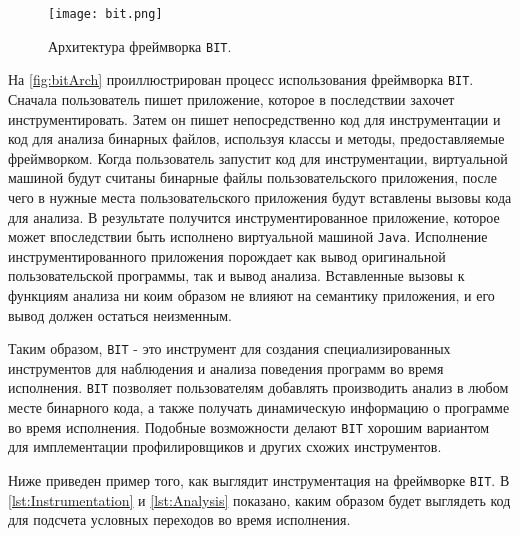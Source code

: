 \begin{figure}[h]
\centering
\texttt{[image: bit.png]}
\caption{Архитектура фреймворка \texttt{BIT}.}
\label{fig:bitArch}
\end{figure}

На \autoref{fig:bitArch} проиллюстрирован процесс использования фреймворка \texttt{BIT}. Сначала пользователь пишет приложение, которое в последствии захочет инструментировать. Затем он пишет непосредственно код для инструментации и код для анализа бинарных файлов, используя классы и методы, предоставляемые фреймворком. Когда пользователь запустит код для инструментации, виртуальной машиной будут считаны бинарные файлы пользовательского приложения, после чего в нужные места пользовательского приложения будут вставлены вызовы кода для анализа. В результате получится инструментированное приложение, которое может впоследствии быть исполнено виртуальной машиной \texttt{Java}. Исполнение инструментированного приложения порождает как вывод оригинальной пользовательской программы, так и вывод анализа. Вставленные вызовы к функциям анализа ни коим образом не влияют на семантику приложения, и его вывод должен остаться неизменным.

Таким образом, \texttt{BIT} - это инструмент для создания специализированных инструментов для наблюдения и анализа поведения программ во время исполнения. \texttt{BIT} позволяет пользователям добавлять производить анализ в любом месте бинарного кода, а также получать динамическую информацию о программе во время исполнения. Подобные возможности делают \texttt{BIT} хорошим вариантом для имплементации профилировщиков и других схожих инструментов.

Ниже приведен пример того, как выглядит инструментация на фреймворке \texttt{BIT}. В \autoref{lst:Instrumentation} и \autoref{lst:Analysis} показано, каким образом будет выглядеть код для подсчета условных переходов во время исполнения.

